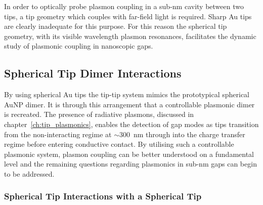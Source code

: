 \documentclass[a4paper]{article}
\begin{document}
In order to optically probe plasmon coupling in a sub-nm cavity between two tips, a tip geometry which couples with far-field light is required. Sharp Au tips are clearly inadequate for this purpose. For this reason the spherical tip geometry, with its visible wavelength plasmon resonances, facilitates the dynamic study of plasmonic coupling in nanoscopic gaps.

\subsection{Spherical Tip Dimer Interactions}

By using spherical Au tips the tip-tip system mimics the prototypical spherical AuNP dimer. It is through this  arrangement that a controllable plasmonic dimer is recreated. The presence of radiative plasmons, discussed in chapter~\ref{ch:tip_plasmonics}, enables the detection of gap modes as tips transition from the non-interacting regime at $\sim$\SI{300}{nm} through into the charge transfer regime before entering conductive contact. By utilising such a controllable plasmonic system, plasmon coupling can be better understood on a fundamental level and the remaining questions regarding plasmonics in sub-nm gaps can begin to be addressed.

\subsubsection{Spherical Tip Interactions with a Spherical Tip}
\end{document}
